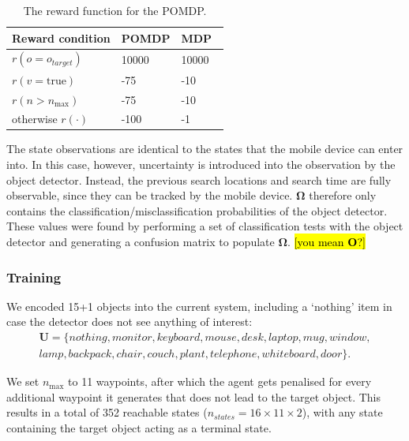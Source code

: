 \documentclass[runningheads]{llncs}
\DeclareRobustCommand{\tofix}[1]{{\sethlcolor{yellow}\hl{[#1]}}}
\begin{document}
\begin{table}
  \centering
  \caption{The reward function for the POMDP. }\label{tab:rewards}
  \begin{tabular}{p{3cm}p{2cm}p{2cm}}
    \toprule
    Reward condition        & POMDP  & MDP~\cite{lock2019active}   \\ \midrule
    $r(o = o_{target})$     & 10000  & 10000 \\ 
    $r(v = \textrm{true})$  & -75    & -10   \\
    $r(n > n_{\max})$       & -75    & -10   \\
    otherwise $r(\cdot)$    & -100   & -1    \\
    \bottomrule
  \end{tabular}
\end{table}

The state observations are identical to the states that the mobile device can enter into. 
In this case, however, uncertainty is introduced into the observation by the object detector.
Instead, the previous search locations and search time are fully observable, since they can be tracked by the mobile device.
$\mathbf{\Omega}$ therefore only contains the classification/misclassification probabilities of the object detector.
These values were found by performing a set of classification tests with the object detector and generating a confusion matrix to populate $\mathbf{\Omega}$. \tofix{you mean $\mathbf{O}$?}

\subsubsection{Training}

We encoded 15+1 objects into the current system, including a `nothing' item in case the detector does not see anything of interest:
\begin{equation*}
  \begin{split}
    \mathbf{U} = \{ nothing, monitor, keyboard, mouse, desk, laptop, mug, window,\\ 
      lamp, backpack, chair, couch, plant, telephone, whiteboard, door \}.
  \end{split}
\end{equation*}

\noindent We set $n_{\max}$ to 11 waypoints, after which the agent gets penalised for every additional waypoint it generates that does not lead to the target object. 
This results in a total of 352 reachable states ($n_{states} = 16\times11\times2$), with any state containing the target object acting as a terminal state.
\end{document}
